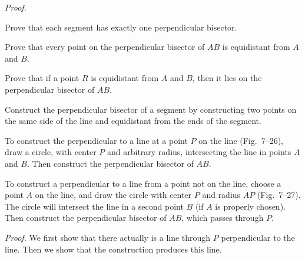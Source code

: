 \documentclass[11pt]{book}
\theoremstyle{bkplain}
\theoremstyle{XIplainnote}
\theoremstyle{bkplain}
\theoremstyle{bkplain}
\begin{document}
\noindent\emph{Proof.}
\begin{steps}
\end{steps}

\begin{exercisecols}
\begin{exlist}
\item Prove that each segment has exactly one perpendicular bisector.
\item Prove that every point on the perpendicular bisector of $AB$ is
  equidistant from $A$ and $B$.
\item Prove that if a point $R$ is equidistant from $A$ and $B$, then it lies
  on the perpendicular bisector of $AB$.
\item Construct the perpendicular bisector of a segment by constructing two
  points on the same side of the line and equidistant from the ends of the
  segment.
\end{exlist}
\end{exercisecols}

\begin{construction}
To construct the perpendicular to a line at a point $P$ on the line
(Fig.~7--26), draw a circle, with center $P$ and arbitrary radius, intersecting
the line in points $A$ and $B$. Then construct the perpendicular bisector of
$AB$.
\end{construction}

\begin{construction}
To construct a perpendicular to a line from a point not on the line, choose a
point $A$ on the line, and draw the circle with center $P$ and radius $AP$
(Fig.~7--27). The circle will intersect the line in a second point $B$ (if $A$
is properly chosen). Then construct the perpendicular bisector of $AB$, which
passes through $P$.
\end{construction}

\FIGVIITWENTYSIXSEVENEIGHT

\noindent\emph{Proof.}\quad
We first show that there actually is a line through $P$ perpendicular to the
line. Then we show that the \RC{} construction produces this line.
\end{document}
